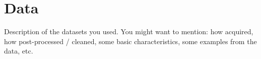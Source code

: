 \section{Data} \label{data}  %

Description of the datasets you used. You might want to mention: how acquired, how post-processed / cleaned, some basic characteristics, some examples from the data, etc.

\blindtext
